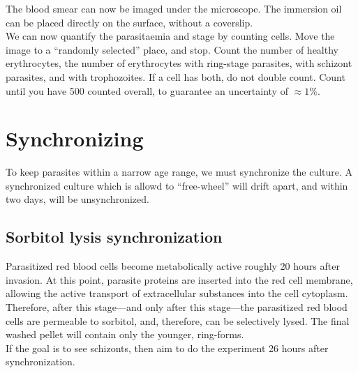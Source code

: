 \documentclass{article}
\begin{document}
The blood smear can now be imaged under the microscope. The immersion oil can be placed directly on the surface, without a coverslip.\\

We can now quantify the parasitaemia and stage by counting cells. Move the image to a ``randomly selected'' place, and stop. Count the number of healthy erythrocytes, the number of erythrocytes with ring-stage parasites, with schizont parasites, and with trophozoites. If a cell has both, do not double count. Count until you have 500 counted overall, to guarantee an uncertainty of $\approx 1\%$.

\newpage
\section{Synchronizing}

To keep parasites within a narrow age range, we must synchronize the culture. A synchronized culture which is allowd to ``free-wheel'' will drift apart, and within two days, will be unsynchronized.\\

\subsection{Sorbitol lysis synchronization}

Parasitized red blood cells become metabolically active roughly 20 hours after invasion. At this point, parasite proteins are inserted into the red cell membrane, allowing the active transport of extracellular substances into the cell cytoplasm. Therefore, after this stage---and only after this stage---the parasitized red blood cells are permeable to sorbitol, and, therefore, can be selectively lysed. The final washed pellet will contain only the younger, ring-forms.\\

If the goal is to see schizonts, then aim to do the experiment 26 hours after synchronization.\\
\end{document}

